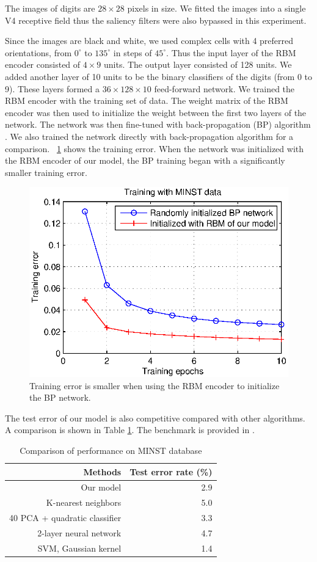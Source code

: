 \documentclass[conference]{IEEEtran}
\begin{document}
The images of digits are $28\times28$ pixels in size.
We fitted the images into a single V4 receptive field thus the saliency filters were also bypassed in this experiment.

Since the images are black and white, we used complex cells with 4 preferred orientations, 
from $0^\circ$ to $135^\circ$ in steps of $45^\circ$.
Thus the input layer of the RBM encoder consisted of $4\times9$ units.
The output layer consisted of 128 units.
We added another layer of 10 units to be the binary classifiers of the digits (from 0 to 9).
These layers formed a $36\times128\times10$ feed-forward network.
We trained the RBM encoder with the training set of data.
The weight matrix of the RBM encoder was then used to initialize 
the weight between the first two layers of the network.
The network was then fine-tuned with back-propagation (BP) algorithm \cite{rumelhart2002}.
We also trained the network directly with back-propagation algorithm for a comparison.
\figurename~\ref{fig:11} shows the training error.
When the network was initialized with the RBM encoder of our model,
the BP training began with a significantly smaller training error.

\begin{figure}[htp]
\centering
\includegraphics[width=0.7\linewidth]{images/fig11.eps}
\caption{Training error is smaller when using the RBM encoder to initialize the BP network.}
\label{fig:11}
\end{figure}

The test error of our model is also competitive compared with other algorithms.
A comparison is shown in Table \ref{tab:3}.
The benchmark is provided in \cite{lecun1998}.

\begin{table}[h]
\caption{Comparison of performance on MINST database}
\centering
\begin{tabular}{rr}
\toprule
Methods & Test error rate (\%) \\
\midrule
Our model & 2.9 \\
K-nearest neighbors & 5.0 \\
40 PCA + quadratic classifier & 3.3 \\
2-layer neural network & 4.7 \\
SVM, Gaussian kernel & 1.4 \\
\bottomrule
\end{tabular}
\label{tab:3}
\end{table}
\end{document}
